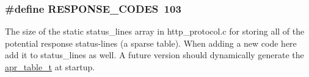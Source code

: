 \subsubsection[{\texorpdfstring{R\+E\+S\+P\+O\+N\+S\+E\+\_\+\+C\+O\+D\+ES}{RESPONSE_CODES}}]{\setlength{\rightskip}{0pt plus 5cm}\#define R\+E\+S\+P\+O\+N\+S\+E\+\_\+\+C\+O\+D\+ES~103}\hypertarget{group__HTTP__Status_ga92c5b6a301e46085a0db6b9d0f36a1ce}{}\label{group__HTTP__Status_ga92c5b6a301e46085a0db6b9d0f36a1ce}
The size of the static status\+\_\+lines array in http\+\_\+protocol.\+c for storing all of the potential response status-\/lines (a sparse table). When adding a new code here add it to status\+\_\+lines as well. A future version should dynamically generate the \hyperlink{structapr__table__t}{apr\+\_\+table\+\_\+t} at startup. 